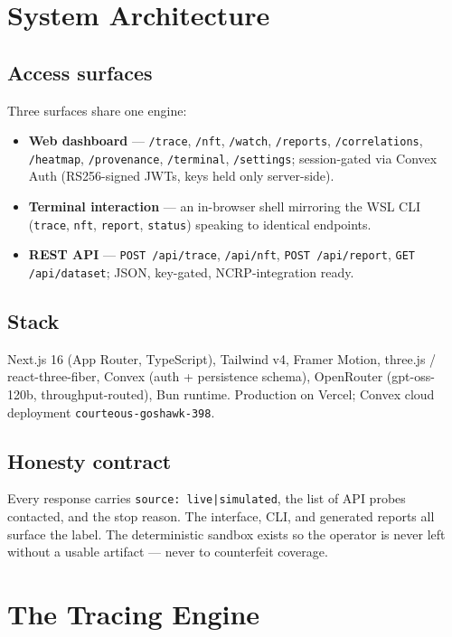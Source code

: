 \documentclass[11pt,a4paper]{article}
\begin{document}
\section{System Architecture}

\subsection{Access surfaces}
Three surfaces share one engine:
\begin{itemize}[itemsep=0.1em]
  \item \textbf{Web dashboard} --- \texttt{/trace}, \texttt{/nft}, \texttt{/watch},
  \texttt{/reports}, \texttt{/correlations}, \texttt{/heatmap}, \texttt{/provenance},
  \texttt{/terminal}, \texttt{/settings}; session-gated via Convex Auth (RS256-signed
  JWTs, keys held only server-side).
  \item \textbf{Terminal interaction} --- an in-browser shell mirroring the WSL CLI
  (\texttt{trace}, \texttt{nft}, \texttt{report}, \texttt{status}) speaking to identical endpoints.
  \item \textbf{REST API} --- \texttt{POST /api/trace}, \texttt{/api/nft},
  \texttt{POST /api/report}, \texttt{GET /api/dataset}; JSON, key-gated,
  NCRP-integration ready.
\end{itemize}

\subsection{Stack}
Next.js 16 (App Router, TypeScript), Tailwind v4, Framer Motion,
three.js / react-three-fiber, Convex (auth + persistence schema), OpenRouter
(gpt-oss-120b, throughput-routed), Bun runtime. Production on Vercel; Convex
cloud deployment \texttt{courteous-goshawk-398}.

\subsection{Honesty contract}
Every response carries \texttt{source: live|simulated}, the list of API probes
contacted, and the stop reason. The interface, CLI, and generated reports all
surface the label. The deterministic sandbox exists so the operator is never
left without a usable artifact --- never to counterfeit coverage.

\section{The Tracing Engine}
\end{document}
